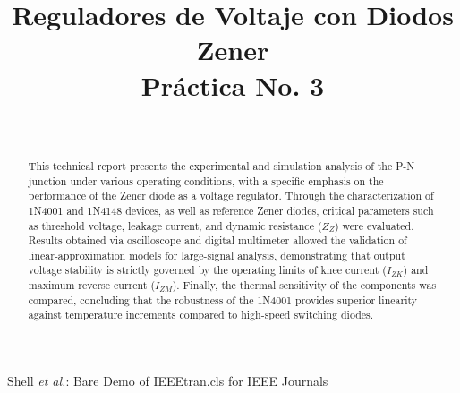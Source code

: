 \documentclass[journal]{IEEEtran}
\begin{document}
\title{Reguladores de Voltaje con Diodos Zener\\ \small{Práctica No. 3}}

\author{
    \\
}
        
{Shell \MakeLowercase{\textit{et al.}}: Bare Demo of IEEEtran.cls for IEEE Journals}

\maketitle

\begin{abstract}
    This technical report presents the experimental and simulation analysis of the P-N junction under various operating conditions, with a specific emphasis on the performance of the Zener diode as a voltage regulator. Through the characterization of 1N4001 and 1N4148 devices, as well as reference Zener diodes, critical parameters such as threshold voltage, leakage current, and dynamic resistance ($Z_Z$) were evaluated. Results obtained via oscilloscope and digital multimeter allowed the validation of linear-approximation models for large-signal analysis, demonstrating that output voltage stability is strictly governed by the operating limits of knee current ($I_{ZK}$) and maximum reverse current ($I_{ZM}$). Finally, the thermal sensitivity of the components was compared, concluding that the robustness of the 1N4001 provides superior linearity against temperature increments compared to high-speed switching diodes.
\end{abstract}
\end{document}
